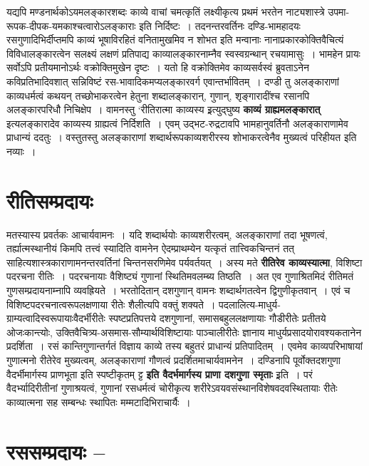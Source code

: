 {यद्यपि मण्डनार्थकोऽयमलङ्कारशब्दः काव्ये वाचां चमत्कृतिं लक्ष्यीकृत्य प्रथमं भरतेन नाट्यशास्त्रे उपमा-रूपक-दीपक-यमकाश्चत्वारोऽलङ्काराः इति निर्दिष्टः~। तदनन्तरवर्तिनः दण्डि-भामहादयः रसगुणादिभिर्दीप्तमपि काव्यं भूषाविरहितं वनितामुखमिव न शोभत इति मन्वानाः नानाप्रकारकोक्तिवैचित्यं विविधालङ्कारत्वेन सलक्ष्यं लक्षणं प्रतिपाद्य काव्यालङ्कारनाम्नैव स्वस्वग्रन्थान् रचयामासुः~। भामहेन प्रायः सर्वोऽपि प्रतीयमानोऽर्थः वक्रोक्तिमुखेन दृष्टः~। यतो हि वक्रोक्तिमेव काव्यसर्वस्वं ब्रुवताऽनेन कविप्रतिभादिवशात् सन्निविष्टं रस-भावादिकमप्यलङ्कारवर्ग एवान्तर्भावितम्~। दण्डी तु अलङ्काराणां काव्यधर्मत्वं कथयन् तच्छोभाकरत्वेन हेतुना शब्दालङ्कारान्, गुणान्, शृङ्गारादींश्च रसानपि अलङ्कारपरिधौ निचिक्षेप~। वामनस्तु ‘रीतिरात्मा काव्यस्य इ्रत्युद्घुष्य \textbf{काव्यं ग्राह्यमलङ्कारात्} इत्यलङ्कारादेव काव्यस्य ग्राह्यत्वं निर्दिशति~।   एवम् उद्भट-रुद्रटावपि भामहानुवर्तिनौ अलङ्काराणामेव प्राधान्यं ददतुः~। वस्तुतस्तु अलङ्काराणां शब्दार्थरूपकाव्यशरीरस्य  शोभाकरत्वेनैव मुख्यत्वं परिहीयत इति नव्याः~। 

\section*{ रीतिसम्प्रदायः}

मतस्यास्य प्रवर्तकः आचार्यवामनः~। यदि शब्दार्थयोः काव्यशरीरत्वम्, अलङ्काराणां तदा\-	भूषणत्वं, तर्ह्यात्मस्थानीयं किमपि तत्त्वं स्यादिति वामनेन ऐदम्प्राथम्येन यत्कृतं तात्त्विक\-चिन्तनं तत् साहित्यशास्त्रकाराणामनन्तरवर्तिनां चिन्तनसरणिमेव पर्यवर्तयत्~। अस्य मते \textbf{\break रीतिरेव काव्यस्यात्मा}, विशिष्टा पदरचना रीतिः~। पदरचनायाः वैशिष्ट्यं गुणानां स्थिति\-मवलम्ब्य तिष्ठति~। अत एव गुणाश्रितमिदं रीतिमतं गुणसम्प्रदायनाम्नापि व्यवह्रियते~। भरतोदितान् दशगुणान् वामनः शब्दार्थगतत्वेन द्विगुणीकृतवान्~। एवं च विशिष्टपदरचनात्वरूपलक्षणाया रीतेः शैलीत्यपि वक्तुं शक्यते~। पदलालित्य-माधुर्य-ग्राम्यत्वादिस्वरूपायाः\break वैदर्भीरीतेः स्पष्टप्रतिपत्तये दशगुणानां, समासबहुललक्षणायाः गौडीरीतेः प्रतीतये ओजःकान्त्योः, उक्तिवैचित्र्य-असमास-सौम्यार्थविशिष्टायाः पाञ्चालीरीतेः ज्ञानाय माधुर्यप्रसादयोरावश्यकतानेन प्रदर्शिता~। रसं कान्तिगुणान्तर्गतं विज्ञाय काव्ये तस्य बहुतरं प्राधान्यं प्रतिपादितम्~। एवमेव काव्यपरिभाषायां गुणात्मनो रीतेरेव मुख्यत्वम्, अलङ्काराणां गौणत्वं प्रदर्शितमाचार्यवामनेन~। दण्डिनापि पूर्वोक्तदशगुणा वैदर्भीमार्गस्य प्राणभूता इति स्पष्टीकृतम् ट्ट \textbf{इति वैदर्भमार्गस्य प्राणा दशगुणा स्मृताः} इ्रति~। परं वैदर्भ्यादिरीतीनां गुणाश्रयत्वं, गुणानां रसधर्मत्वं चोरीकृत्य शरीरेऽवयवसंस्थानविशेषवदवस्थितायाः रीतेः काव्यात्मना सह सम्बन्धः स्थापितः मम्मटादिभिराचार्यैः~। 

\section*{ रससम्प्रदायः --}

}
